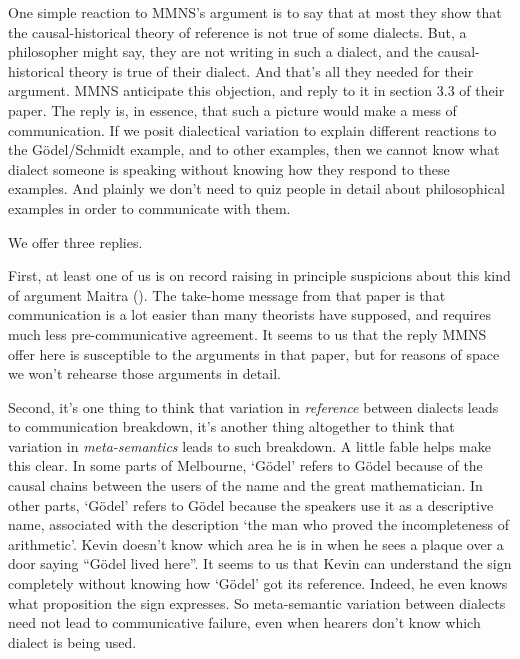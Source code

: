 \documentclass[
  11pt,
  letterpaper,
  DIV=11,
  numbers=noendperiod,
  twoside]{scrartcl}
\begin{document}
One simple reaction to MMNS's argument is to say that at most they show
that the causal-historical theory of reference is not true of some
dialects. But, a philosopher might say, they are not writing in such a
dialect, and the causal-historical theory is true of their dialect. And
that's all they needed for their argument. MMNS anticipate this
objection, and reply to it in section 3.3 of their paper. The reply is,
in essence, that such a picture would make a mess of communication. If
we posit dialectical variation to explain different reactions to the
Gödel/Schmidt example, and to other examples, then we cannot know what
dialect someone is speaking without knowing how they respond to these
examples. And plainly we don't need to quiz people in detail about
philosophical examples in order to communicate with them.

We offer three replies.

First, at least one of us is on record raising in principle suspicions
about this kind of argument Maitra ().
The take-home message from that paper is that communication is a lot
easier than many theorists have supposed, and requires much less
pre-communicative agreement. It seems to us that the reply MMNS offer
here is susceptible to the arguments in that paper, but for reasons of
space we won't rehearse those arguments in detail.

Second, it's one thing to think that variation in \emph{reference}
between dialects leads to communication breakdown, it's another thing
altogether to think that variation in \emph{meta-semantics} leads to
such breakdown. A little fable helps make this clear. In some parts of
Melbourne, `Gödel' refers to Gödel because of the causal chains between
the users of the name and the great mathematician. In other parts,
`Gödel' refers to Gödel because the speakers use it as a descriptive
name, associated with the description `the man who proved the
incompleteness of arithmetic'. Kevin doesn't know which area he is in
when he sees a plaque over a door saying ``Gödel lived here''. It seems
to us that Kevin can understand the sign completely without knowing how
`Gödel' got its reference. Indeed, he even knows what proposition the
sign expresses. So meta-semantic variation between dialects need not
lead to communicative failure, even when hearers don't know which
dialect is being used.
\end{document}
